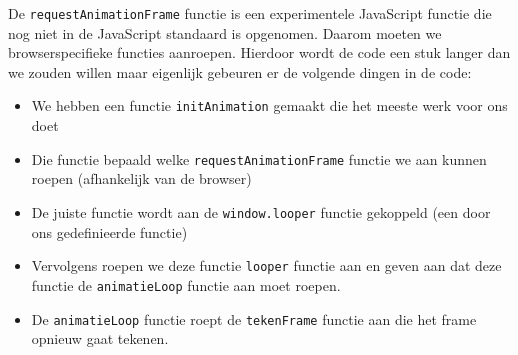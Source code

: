 \documentclass[a4paper]{report}
\begin{document}
\noindent De \texttt{requestAnimationFrame} functie is een experimentele JavaScript functie die nog niet in de JavaScript standaard is opgenomen. Daarom moeten we browserspecifieke functies aanroepen. Hierdoor wordt de code een stuk langer dan we zouden willen maar eigenlijk gebeuren er de volgende dingen in de code:
\begin{itemize}
	\item We hebben een functie \texttt{initAnimation} gemaakt die het meeste werk voor ons doet
	\item Die functie bepaald welke \texttt{requestAnimationFrame} functie we aan kunnen roepen (afhankelijk van de browser)
	\item De juiste functie wordt aan de \texttt{window.looper} functie gekoppeld (een door ons gedefinieerde functie)
	\item Vervolgens roepen we deze functie \texttt{looper} functie aan en geven aan dat deze functie de \texttt{animatieLoop} functie aan moet roepen.
	\item De \texttt{animatieLoop} functie roept de \texttt{tekenFrame} functie aan die het frame opnieuw gaat tekenen.
\end{itemize}
\end{document}

